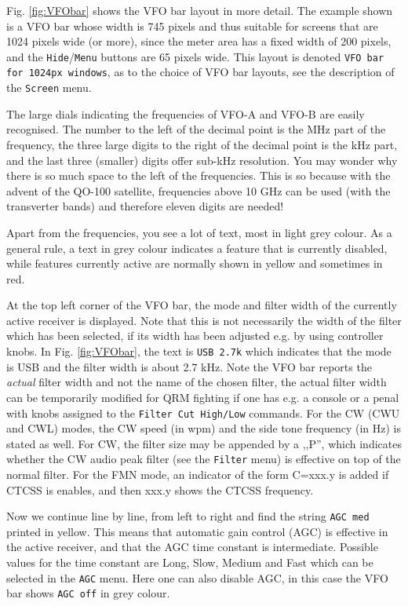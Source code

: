 \documentclass[12pt]{book}
\def\rett#1{\texttt{\color{red}#1}}
\def\bltt#1{\texttt{\color{blue}#1}}
\begin{document}
Fig. \ref{fig:VFObar} shows the VFO bar layout in more  detail.
The example shown is a VFO bar whose width is 745 pixels and
thus suitable for screens that are 1024 pixels wide (or more),
since the meter area has a fixed width of 200 pixels, and
the \rett{Hide}/\rett{Menu} buttons are 65 pixels wide. This layout is
denoted \texttt{VFO bar for 1024px windows}, as to the choice
of VFO bar layouts, see the description of the \bltt{Screen} menu.

The large dials indicating the frequencies of VFO-A and VFO-B
are easily recognised. The number to the left of the decimal
point is the MHz part of the frequency, the three  large digits
to the right  of  the decimal point is the kHz part, and
the last three (smaller) digits offer sub-kHz resolution.
You may wonder why there is  so much space to the left of
the frequencies. This is so because with the advent of
the QO-100 satellite, frequencies above 10 GHz can be
used (with the transverter bands) and therefore eleven
digits are needed!

Apart from the frequencies, you see a lot  of text, most in
light grey colour. As a general rule, a text  in grey
colour indicates a feature that is currently disabled,
while features currently active are normally shown in
yellow and sometimes in red.

At the top left  corner of the VFO bar, the mode and
filter width of the currently active receiver is displayed.
Note that this is not necessarily the width of the filter
which has been selected, if its width has been adjusted
e.g. by using controller knobs.
In Fig. \ref{fig:VFObar}, the text is \rett{USB 2.7k}
which indicates that the  mode
is USB and the filter width is about 2.7 kHz.
Note the VFO bar reports the
\textit{actual} filter width and not the name of the chosen filter,
the actual filter width can be temporarily modified for QRM fighting
if one has e.g. a console or a penal with knobs assigned to the \bltt{Filter Cut High/Low}
commands.
For the CW (CWU and CWL) modes, the CW speed (in wpm) and the side tone
frequency (in Hz) is stated as well. For CW, the filter size may be appended
by a ,,P'', which indicates whether the CW audio peak filter (see the
\bltt{Filter} menu) is effective on top of the normal filter.
For the FMN mode, an indicator of the form C=xxx.y is added if
CTCSS is enables, and then xxx.y shows the CTCSS frequency.

Now we continue line by line, from left to right and find
the string \rett{AGC med} printed in yellow. This means
that automatic gain control (AGC)  is effective  in the
active receiver, and that the AGC time constant is
intermediate. Possible values for the time constant
are Long, Slow, Medium and Fast which can be selected
in the \bltt{AGC} menu. Here one can  also disable AGC,
in this case the VFO bar shows \rett{AGC off} in grey
colour.
\end{document}
